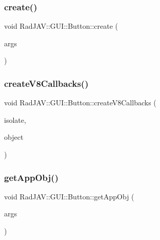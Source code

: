 \subsubsection{\texorpdfstring{create()}{create()}}
{\footnotesize\ttfamily void Rad\+J\+A\+V\+::\+G\+U\+I\+::\+Button\+::create (\begin{DoxyParamCaption}\item[{const v8\+::\+Function\+Callback\+Info$<$ v8\+::\+Value $>$ \&}]{args }\end{DoxyParamCaption})\hspace{0.3cm}{\ttfamily [static]}}

\mbox{\label{class_rad_j_a_v_1_1_g_u_i_1_1_button_a60619ce508157f8ca4df12ae4c89f26c}} 
\subsubsection{\texorpdfstring{create\+V8\+Callbacks()}{createV8Callbacks()}}
{\footnotesize\ttfamily void Rad\+J\+A\+V\+::\+G\+U\+I\+::\+Button\+::create\+V8\+Callbacks (\begin{DoxyParamCaption}\item[{v8\+::\+Isolate $\ast$}]{isolate,  }\item[{v8\+::\+Local$<$ v8\+::\+Object $>$}]{object }\end{DoxyParamCaption})\hspace{0.3cm}{\ttfamily [static]}}

\mbox{\label{class_rad_j_a_v_1_1_g_u_i_1_1_button_ab4492f472e97de26dede37d6a9367ee6}} 
\subsubsection{\texorpdfstring{get\+App\+Obj()}{getAppObj()}}
{\footnotesize\ttfamily void Rad\+J\+A\+V\+::\+G\+U\+I\+::\+Button\+::get\+App\+Obj (\begin{DoxyParamCaption}\item[{const v8\+::\+Function\+Callback\+Info$<$ v8\+::\+Value $>$ \&}]{args }\end{DoxyParamCaption})\hspace{0.3cm}{\ttfamily [static]}}

